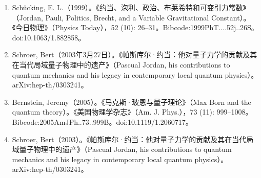 \begin{enumerate}
\item Schücking, E. L.（1999）。《约当、泡利、政治、布莱希特和可变引力常数》（Jordan, Pauli, Politics, Brecht, and a Variable Gravitational Constant）。《今日物理》（Physics Today），52 (10): 26–31。Bibcode:1999PhT....52j..26S。doi:10.1063/1.882858。
\item Schroer, Bert（2003年3月27日）。《帕斯库尔·约当：他对量子力学的贡献及其在当代局域量子物理中的遗产》（Pascual Jordan, his contributions to quantum mechanics and his legacy in contemporary local quantum physics）。arXiv:hep-th/0303241。
\item Bernstein, Jeremy（2005）。《马克斯·玻恩与量子理论》（Max Born and the quantum theory）。《美国物理学杂志》（Am. J. Phys.），73 (11): 999–1008。Bibcode:2005AmJPh..73..999B。doi:10.1119/1.2060717。
\item Schroer, Bert（2003）。《帕斯库尔·约当：他对量子力学的贡献及其在当代局域量子物理中的遗产》（Pascual Jordan, his contributions to quantum mechanics and his legacy in contemporary local quantum physics）。arXiv:hep-th/0303241。
\end{enumerate}